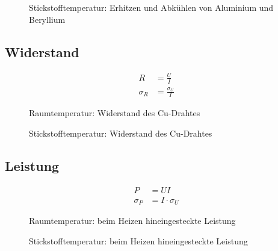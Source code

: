 \documentclass[12pt,a4paper,titlepage,headinclude,bibtotoc]{scrartcl}
\begin{document}
\begin{figure}[!htb]
	\centering
	
	\caption{Stickstofftemperatur: Erhitzen und Abkühlen von Aluminium und Beryllium}
	\label{fig:Stickstofftemp}
\end{figure}

\subsection{Widerstand}
\begin{align}
	R&=\frac{U}{I}\\
	\sigma_R&=\frac{\sigma_U}{I}
\end{align}
\begin{figure}[!htb]
	\centering
	
	\caption{Raumtemperatur: Widerstand des Cu-Drahtes}
	\label{fig:Widerstand_Raum}
\end{figure}

\begin{figure}[!htb]
	\centering
	
	\caption{Stickstofftemperatur: Widerstand des Cu-Drahtes}
	\label{fig:Widerstand_Stick}
\end{figure}

\subsection{Leistung}
\begin{align}
	P&=UI\\
	\sigma_P&=I\cdot\sigma_U
\end{align}
\begin{figure}[!htb]
	\centering
	
	\caption{Raumtemperatur: beim Heizen hineingesteckte Leistung}
	\label{fig:Leistung_Raum}
\end{figure}

\begin{figure}[!htb]
	\centering
	
	\caption{Stickstofftemperatur: beim Heizen hineingesteckte Leistung}
	\label{fig:Leistung_Stick}
\end{figure}
\end{document}
